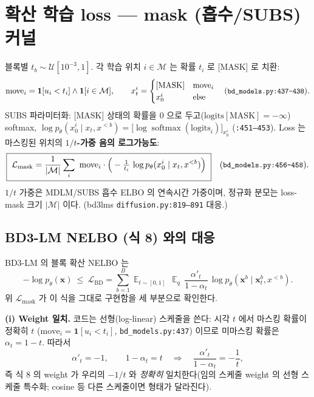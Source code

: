 \documentclass[11pt]{article}
\newcommand{\code}[1]{\texttt{\small #1}}
\newcommand{\pth}{p_\theta}
\newcommand{\xz}{x_0}
\newcommand{\xt}{x_t}
\newcommand{\xpre}{x^{<b}}
\newcommand{\bLM}{\mathcal{M}}
\DeclareMathOperator{\softmax}{softmax}
\DeclareMathOperator*{\E}{\mathbb{E}}
\theoremstyle{definition}
\begin{document}
\section{확산 학습 loss — mask (흡수/SUBS) 커널}
블록별 $t_b\sim\mathcal U[10^{-3},1]$. 각 학습 위치 $i\in\bLM$ 는 확률 $t_i$ 로 [MASK] 로 치환:
\begin{equation}
\text{move}_i=\mathbf 1[u_i<t_i]\wedge\mathbf 1[i\in\bLM],\qquad
\xt^i=\begin{cases}\text{[MASK]}&\text{move}_i\\ \xz^i&\text{else}\end{cases}
\quad(\code{bd\_models.py:437--438}).
\end{equation}
SUBS 파라미터화: [MASK] 상태의 확률을 0 으로 두고($\text{logits}[\text{MASK}]{=}-\infty$) softmax,
$\log \pth(\xz^i\mid \xt,\xpre)=\big[\log\softmax(\text{logits}_i)\big]_{\xz^i}$
(\code{:451--453}). Loss 는 마스킹된 위치의 \textbf{$1/t$-가중 음의 로그가능도}:
\begin{equation}
\boxed{\;\mathcal L_{\text{mask}}
=\frac{1}{|\bLM|}\sum_{i}\ \text{move}_i\cdot\Big(-\tfrac{1}{t_i}\,\log \pth(\xz^i\mid \xt,\xpre)\Big)\;}
\quad(\code{bd\_models.py:456--458}).
\end{equation}
$1/t$ 가중은 MDLM/SUBS 흡수 ELBO 의 연속시간 가중이며, 정규화 분모는 loss-mask 크기 $|\bLM|$ 이다.
(bd3lms \code{diffusion.py:819--891} 대응.)

\subsection*{BD3-LM NELBO (식 8) 와의 대응}
BD3-LM 의 블록 확산 NELBO 는
\begin{equation}
-\log\pth(\mathbf x)\ \le\ \mathcal L_{\mathrm{BD}}
=\sum_{b=1}^{B}\E_{t\sim[0,1]}\,\E_q\,
\frac{\alpha'_t}{1-\alpha_t}\,\log\pth(\mathbf x^b\mid \mathbf x^b_t,\xpre).
\tag{BD3-LM 8}
\end{equation}
위 $\mathcal L_{\text{mask}}$ 가 이 식을 그대로 구현함을 세 부분으로 확인한다.

\textbf{(i) Weight 일치.} 코드는 선형(log-linear) 스케줄을 쓴다: 시각 $t$ 에서 마스킹 확률이
정확히 $t$ ($\text{move}_i=\mathbf 1[u_i<t_i]$, \code{bd\_models.py:437}) 이므로 미마스킹
확률은 $\alpha_t=1-t$. 따라서
\begin{equation}
\alpha'_t=-1,\qquad 1-\alpha_t=t
\quad\Longrightarrow\quad
\frac{\alpha'_t}{1-\alpha_t}=-\frac{1}{t},
\end{equation}
즉 식 8 의 weight 가 우리의 $-1/t$ 와 \emph{정확히} 일치한다(임의 스케줄 weight 의
선형 스케줄 특수화; cosine 등 다른 스케줄이면 형태가 달라진다).
\end{document}
